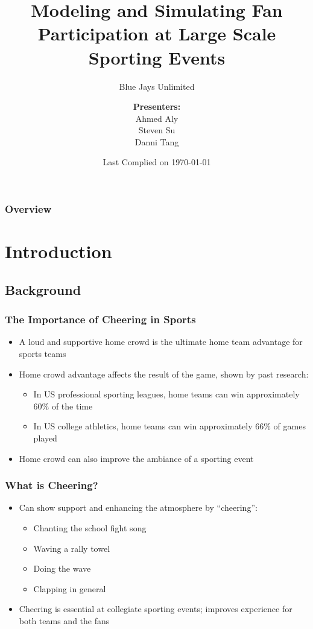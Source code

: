 \documentclass[compress,handout,10pt]{beamer}
\title{{\LARGE Modeling and Simulating Fan Participation at Large Scale Sporting Events\newline} }
\subtitle{{\large Blue Jays Unlimited} }
\author{ 
    {\bf{Presenters:}}\\ 
Ahmed Aly\\
Steven Su \\
Danni Tang\\ 
    \vspace{5pt}
}
\institute{JHU AMS 550.400 Fall 2012}
\date{Last Complied on \today}
\let\olditem\item
\renewcommand{\item}{\setlength{\itemsep}{0.5\baselineskip}\olditem}
\begin{document}
\begin{frame}[plain]
	\titlepage
\end{frame}

\begin{frame}
	\frametitle{Overview}
{\small \tableofcontents}
\end{frame}

\section{Introduction}

\subsection{Background}

\begin{frame}
	\frametitle{The Importance of Cheering in Sports}
		\begin {itemize}
			\item A loud and supportive home crowd is the ultimate home team advantage for sports teams
			\item Home crowd advantage affects the result of the game, shown by past research:
			\begin{itemize}
				\item In US professional sporting leagues, home teams can win approximately 60\% of the time \cite{Jamieson_2010}
				\item In US college athletics, home teams can win approximately 66\% of games played \cite{Snyder_1985}
			\end{itemize}
					\item Home crowd can also improve the ambiance of a sporting event
		\end {itemize}
\end{frame}

\begin{frame}
	\frametitle{What is Cheering?}
		\begin{itemize}
		\item Can show support and enhancing the atmosphere by ``cheering'':
		\begin{itemize}
			\item Chanting the school fight song
			\item Waving a rally towel
			\item Doing the wave
			\item Clapping in general
		\end{itemize}
	\item Cheering is essential at collegiate sporting events; improves experience for both teams and the fans
	\end{itemize}
\end{frame}
\end{document}
